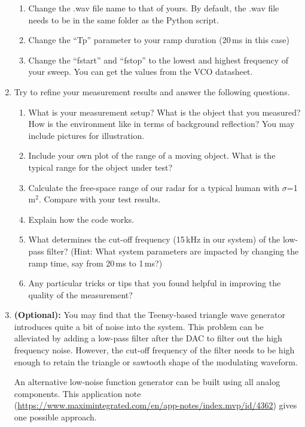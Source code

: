 \documentclass[letterpaper, 11pt]{article}
\begin{document}
\begin{enumerate}
		\begin{enumerate}
			\item Change the .wav file name to that of yours. By default, the .wav file needs to be in the same folder as the Python script.
			
			\item Change the ``Tp'' parameter to your ramp duration (20\,ms in this case)
			
			\item Change the ``fstart'' and ``fstop'' to the lowest and highest frequency of your sweep. You can get the values from the VCO datasheet. 
			
		\end{enumerate}
	\item Try to refine your measurement results and answer the following questions.
		\begin{enumerate}
			\item What is your measurement setup? What is the object that you measured? How is the environment like in terms of background reflection? You may include pictures for illustration. 
			
			\item Include your own plot of the range of a moving object. What is the typical range for the object under test? 
			
			\item Calculate the free-space range of our radar for a typical human with $\sigma$=1\,m$^2$. Compare with your test results.
			
			\item Explain how the code works. 
			
			\item What determines the cut-off frequency (15\,kHz in our system) of the low-pass filter? (Hint: What system parameters are impacted by changing the ramp time, say from 20\,ms to 1\,ms?)
						
			\item Any particular tricks or tips that you found helpful in improving the quality of the measurement? 
						
		\end{enumerate} 
	
	\item \textbf{(Optional):} You may find that the Teensy-based triangle wave generator introduces quite a bit of noise into the system. This problem can be alleviated by adding a low-pass filter after the DAC to filter out the high frequency noise. However, the cut-off frequency of the filter needs to be high enough to retain the triangle or sawtooth shape of the modulating waveform. 
	
	An alternative low-noise function generator can be built using all analog components. This application note (\url{https://www.maximintegrated.com/en/app-notes/index.mvp/id/4362}) gives one possible approach. 
	
	
\end{enumerate}
\end{document}
